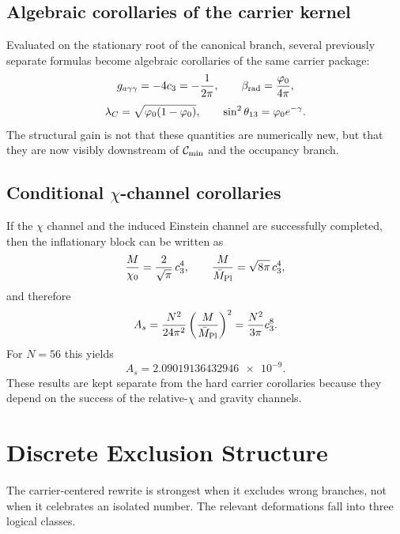 \subsection{Algebraic corollaries of the carrier kernel}

Evaluated on the stationary root of the canonical branch, several previously separate formulas become algebraic corollaries of the same carrier package:
\[
g_{a\gamma\gamma}=-4c_3=-\frac{1}{2\pi},
\qquad
\beta_{\mathrm{rad}}=\frac{\varphi_0}{4\pi},
\]
\[
\lambda_C=\sqrt{\varphi_0(1-\varphi_0)},
\qquad
\sin^2\theta_{13}=\varphi_0 e^{-\gamma}.
\]
The structural gain is not that these quantities are numerically new, but that they are now visibly downstream of $\mathcal C_{\min}$ and the occupancy branch.

\subsection{Conditional \texorpdfstring{$\chi$}{chi}-channel corollaries}

If the $\chi$ channel and the induced Einstein channel are successfully completed, then the inflationary block can be written as
\[
\frac{M}{\chi_0}=\frac{2}{\sqrt{\pi}}\,c_3^4,
\qquad
\frac{M}{\bar M_{\mathrm{Pl}}}=\sqrt{8\pi}\,c_3^4,
\]
and therefore
\[
A_s=\frac{N^2}{24\pi^2}\left(\frac{M}{\bar M_{\mathrm{Pl}}}\right)^2
= \frac{N^2}{3\pi}c_3^8.
\]
For $N=56$ this yields
\[
A_s=\num{2.09019136432946e-9}.
\]
These results are kept separate from the hard carrier corollaries because they depend on the success of the relative-$\chi$ and gravity channels.

\section{Discrete Exclusion Structure}

The carrier-centered rewrite is strongest when it excludes wrong branches, not when it celebrates an isolated number. The relevant deformations fall into three logical classes.

